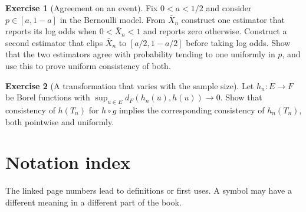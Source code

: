 \documentclass[11pt,oneside]{book}
\theoremstyle{definition}
\newtheorem{exercise}{Exercise}[section]
\theoremstyle{remark}
\begin{document}
\begin{exercise}[Agreement on an event]
\label{exer:asymptotic-transform-agreement}
Fix $0<a<1/2$ and consider $p\in[a,1-a]$ in the Bernoulli
model. From $\bar X_n$ construct one estimator that reports
its log odds when $0<\bar X_n<1$ and reports zero otherwise.
Construct a second estimator that clips $\bar X_n$ to
$[a/2,1-a/2]$ before taking log odds. Show that the two estimators
agree with probability tending to one uniformly in $p$,
and use this to prove uniform consistency of both.
\end{exercise}

\begin{exercise}[A transformation that varies with the sample size]
\label{exer:asymptotic-transform-varying-map}
Let $h_n:E\to F$ be Borel functions with
$\sup_{u\in E}d_F(h_n(u),h(u))\to0$. Show that consistency of
$h(T_n)$ for $h\circ g$ implies the corresponding consistency
of $h_n(T_n)$, both pointwise and uniformly.
\end{exercise}

\chapter*{Notation index}
\label{chap:notation-index}

The linked page numbers lead to definitions or first uses. A symbol may
have a different meaning in a different part of the book.

\printnotationentries
\end{document}
